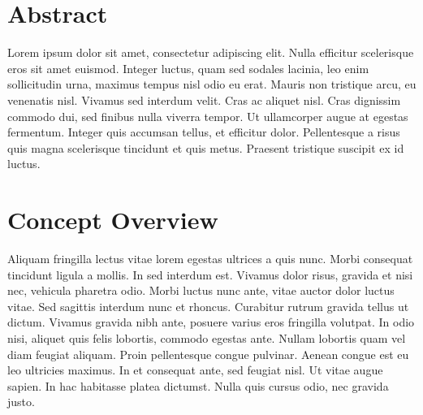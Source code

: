 \documentclass[
10pt, %
a4paper, %
twocolumn, %
landscape %
]{article}
\begin{document}
\pagestyle{myheadings} %
\markright{\doctitle} %


\thispagestyle{plain} %

\printtitle %


\section{Abstract} %

Lorem ipsum dolor sit amet, consectetur adipiscing elit. Nulla efficitur scelerisque eros sit amet euismod. Integer luctus, quam sed sodales lacinia, leo enim sollicitudin urna, maximus tempus nisl odio eu erat. Mauris non tristique arcu, eu venenatis nisl. Vivamus sed interdum velit. Cras ac aliquet nisl. Cras dignissim commodo dui, sed finibus nulla viverra tempor. Ut ullamcorper augue at egestas fermentum. Integer quis accumsan tellus, et efficitur dolor. Pellentesque a risus quis magna scelerisque tincidunt et quis metus. Praesent tristique suscipit ex id luctus.


\section{Concept Overview} %

Aliquam fringilla lectus vitae lorem egestas ultrices a quis nunc. Morbi consequat tincidunt ligula a mollis. In sed interdum est. Vivamus dolor risus, gravida et nisi nec, vehicula pharetra odio. Morbi luctus nunc ante, vitae auctor dolor luctus vitae. Sed sagittis interdum nunc et rhoncus. Curabitur rutrum gravida tellus ut dictum. Vivamus gravida nibh ante, posuere varius eros fringilla volutpat. In odio nisi, aliquet quis felis lobortis, commodo egestas ante. Nullam lobortis quam vel diam feugiat aliquam. Proin pellentesque congue pulvinar. Aenean congue est eu leo ultricies maximus. In et consequat ante, sed feugiat nisl. Ut vitae augue sapien. In hac habitasse platea dictumst. Nulla quis cursus odio, nec gravida justo.
\end{document}
